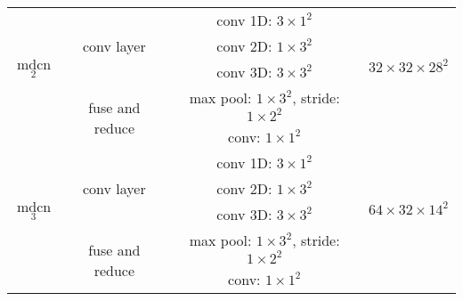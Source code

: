 \begin{table*}[]
\begin{tabular}{|cc|cc|cc|}
\multicolumn{1}{|c|}{\multirow{4}{*}{mdcn$_2$}} & \multicolumn{1}{c|}{\multirow{3}{*}{conv layer}} & \multicolumn{2}{c|}{conv 1D: ${3}\times{{1}^2}$}   & \multicolumn{2}{c|}{\multirow{4}{*}{$32\times{32}\times{28}^2$}}      \\
\multicolumn{1}{|c|}{}                       & \multicolumn{1}{c|}{}                            & \multicolumn{2}{c|}{conv 2D: ${1}\times{{3}^2} $}           & \multicolumn{2}{c|}{}                             \\
\multicolumn{1}{|c|}{}                       & \multicolumn{1}{c|}{}                            & \multicolumn{2}{c|}{conv 3D: ${3}\times{{3}^2} $}           & \multicolumn{2}{c|}{}                             \\ \cline{2-4}

\multicolumn{1}{|c|}{}                                     & \multirow{2}{*}{fuse and reduce} & \multicolumn{2}{c|}{max pool: ${1}\times{{3}^2} $, stride:  ${1}\times{{2}^2} $ }            & \multicolumn{2}{c|}{}     \\ 
\multicolumn{1}{|c|}{}   &       & \multicolumn{2}{c|}{conv: ${1}\times{{1}^2} $ }  & \multicolumn{2}{c|}{} \\ \hline


\multicolumn{1}{|c|}{\multirow{4}{*}{mdcn$_3$}} & \multicolumn{1}{c|}{\multirow{3}{*}{conv layer}} & \multicolumn{2}{c|}{conv 1D: ${3}\times{{1}^2}$}   & \multicolumn{2}{c|}{\multirow{4}{*}{$64\times{32}\times{14}^2$}}      \\
\multicolumn{1}{|c|}{}                       & \multicolumn{1}{c|}{}                            & \multicolumn{2}{c|}{conv 2D: ${1}\times{{3}^2} $}           & \multicolumn{2}{c|}{}                             \\
\multicolumn{1}{|c|}{}                       & \multicolumn{1}{c|}{}                            & \multicolumn{2}{c|}{conv 3D: ${3}\times{{3}^2} $}           & \multicolumn{2}{c|}{}                             \\ \cline{2-4}

\multicolumn{1}{|c|}{}                                     & \multirow{2}{*}{fuse and reduce} & \multicolumn{2}{c|}{max pool: ${1}\times{{3}^2} $, stride:  ${1}\times{{2}^2} $ }            & \multicolumn{2}{c|}{}     \\ 
\multicolumn{1}{|c|}{}   &       & \multicolumn{2}{c|}{conv: ${1}\times{{1}^2} $ }  & \multicolumn{2}{c|}{} \\ \hline



\end{tabular}
\end{table*}
